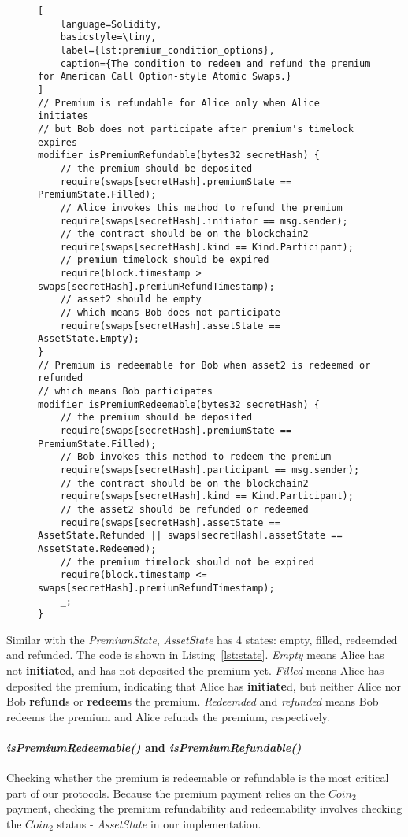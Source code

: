 \begin{figure}[htb]
\begin{lstlisting}[
    language=Solidity, 
    basicstyle=\tiny,
    label={lst:premium_condition_options},
    caption={The condition to redeem and refund the premium for American Call Option-style Atomic Swaps.}
]
// Premium is refundable for Alice only when Alice initiates
// but Bob does not participate after premium's timelock expires
modifier isPremiumRefundable(bytes32 secretHash) {
    // the premium should be deposited
    require(swaps[secretHash].premiumState == PremiumState.Filled);
    // Alice invokes this method to refund the premium
    require(swaps[secretHash].initiator == msg.sender);
    // the contract should be on the blockchain2
    require(swaps[secretHash].kind == Kind.Participant);
    // premium timelock should be expired
    require(block.timestamp > swaps[secretHash].premiumRefundTimestamp);
    // asset2 should be empty
    // which means Bob does not participate
    require(swaps[secretHash].assetState == AssetState.Empty);
}
// Premium is redeemable for Bob when asset2 is redeemed or refunded
// which means Bob participates
modifier isPremiumRedeemable(bytes32 secretHash) {
    // the premium should be deposited
    require(swaps[secretHash].premiumState == PremiumState.Filled);
    // Bob invokes this method to redeem the premium
    require(swaps[secretHash].participant == msg.sender);
    // the contract should be on the blockchain2
    require(swaps[secretHash].kind == Kind.Participant);
    // the asset2 should be refunded or redeemed
    require(swaps[secretHash].assetState == AssetState.Refunded || swaps[secretHash].assetState == AssetState.Redeemed);
    // the premium timelock should not be expired
    require(block.timestamp <= swaps[secretHash].premiumRefundTimestamp);
    _;
}
\end{lstlisting}
\end{figure}

Similar with the \textit{PremiumState}, \textit{AssetState} has 4 states: empty, filled, redeemded and refunded.
The code is shown in Listing~\ref{lst:state}.
\textit{Empty} means Alice has not \textbf{initiate}d, and has not deposited the premium yet.
\textit{Filled} means Alice has deposited the premium, indicating that Alice has \textbf{initiate}d, but neither Alice nor Bob \textbf{refund}s or \textbf{redeem}s the premium.
\textit{Redeemded} and \textit{refunded} means Bob redeems the premium and Alice refunds the premium, respectively.

\paragraph{\textit{isPremiumRedeemable()} and \textit{isPremiumRefundable()}}
Checking whether the premium is redeemable or refundable is the most critical part of our protocols.
Because the premium payment relies on the $Coin_2$ payment, checking the premium refundability and redeemability involves checking the $Coin_2$ status - \textit{AssetState} in our implementation.

